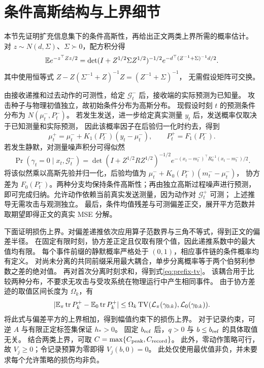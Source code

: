 \section{条件高斯结构与上界细节}
\label{app:conditional}
本节先证明扩充信息集下的条件高斯性，再给出正文两类上界所需的概率估计。
对 $z\sim N(d,\Sigma)$、$\Sigma\succ0$，配方积分得
\begin{equation}
 \mathbb E e^{-z^\top Zz/2}=\det(I+Z^{1/2}\Sigma Z^{1/2})^{-1/2}
 e^{-d^\top(Z^{-1}+\Sigma)^{-1}d/2}.
 \label{eq:gaussian-integral}
\end{equation}
其中使用恒等式 $Z-Z(\Sigma^{-1}+Z)^{-1}Z=(Z^{-1}+\Sigma)^{-1}$，
无需假设矩阵可交换。

由接收递推和过去动作的可测性，给定 $\mathcal G_t^-$ 后，接收端的实际预测为已知量。
攻击种子与物理初值独立，故初始条件分布为高斯分布。
现假设时刻 $t$ 的预测条件分布为 $N(\mu_t^-,P_t^-)$。
若发生发送，进一步给定真实测量 $y_t$ 后，发送概率仅取决于已知测量和实际预测，
因此该概率因子在后验归一化时约去，得到
\begin{equation}
 \mu_t^+=\mu_t^-+K_1(P_t^-)(y_t-\mu_t^-),\qquad P_t^+=F_1(P_t^-).
\end{equation}
若发生静默，对测量噪声积分可得似然
\begin{equation}
 \Pr(\gamma_t=0\mid x_t,\mathcal G_t^-)
 =\det(I+Z^{1/2}RZ^{1/2})^{-1/2}
 e^{-(x_t-m_t^-)^\top R_0^{-1}(x_t-m_t^-)/2}.
\end{equation}
将该似然乘以高斯先验并归一化，后验均值为 $\mu_t^-+K_0(P_t^-)(m_t^--\mu_t^-)$，
协方差为 $F_0(P_t^-)$。两种分支均保持条件高斯性；再由独立高斯过程噪声进行预测，
即可完成归纳。允许动作依赖当前真实发送测量，因为动作对 $\mathcal G_t^+$ 可测；
上述推导无需攻击与观测独立。
最后，条件均值残差与可测偏差正交，展开平方范数并取期望即得正文的真实 MSE 分解。

下面证明损伤上界。对偏差递推依次应用算子范数界与三角不等式，得到正文的偏差半径。
在固定有限时刻，协方差正定且仅取有限个值，因此递推系数中的最大值均有限。
每个事件前缀的静默概率严格处于 $(0,1)$，相应事件链的条件概率均有定义。
对尚未分离的共同前缀采用最大耦合，单步分离概率等于两个伯努利参数之差的绝对值。
再对首次分离时刻求和，得到式\eqref{eq:prefix-tv}。
该耦合用于比较两种分布，不要求无攻击与受攻系统在物理运行中产生相同事件。
由于协方差迹的取值区间长度为 $\Omega_k$，有
\begin{equation}
 |\mathbb E_\pi\operatorname{tr}P_k^+-\mathbb E_0\operatorname{tr}P_k^+|
 \le\Omega_k\operatorname{TV}(\mathcal L_\pi(\gamma_{0:k}),\mathcal L_0(\gamma_{0:k})).
\end{equation}
将此式与偏差平方的上界相加，得到幅值约束下的损伤上界。
对于记录约束，可逆 $A$ 与有限正定标签集保证 $h_*>0$。
固定 $b_{\rm ref}$ 后，$q>0$ 与 $b\le b_{\rm ref}$ 的具体取值无关。
结合两类上界，可取 $C=\max\{C_{\rm peak},C_{\rm record}\}$。
此外，零动作策略可行，故 $V_j\ge0$；令记录预算为零即得 $V_j(b,0)=0$。
此处仅使用最优值非负，并未要求每个允许策略的损伤均非负。

